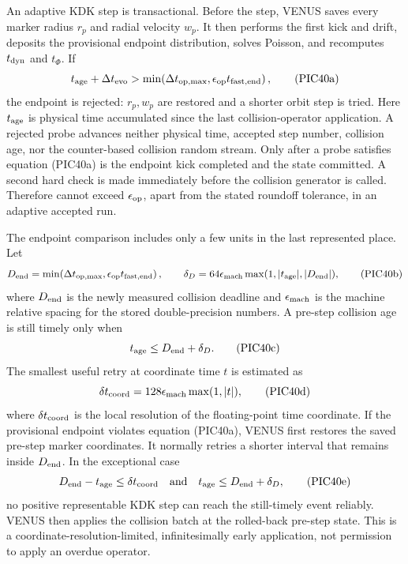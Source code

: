 An adaptive KDK step is transactional.  Before the step, VENUS saves every
marker radius \(r_p\) and radial velocity \(w_p\).  It then performs the first
kick and drift, deposits the provisional endpoint distribution, solves
Poisson, and recomputes \(t_{\rm dyn}\) and \(t_\Phi\).  If
\[
 t_{\rm age}+\Delta t_{\rm evo}>
 \min\!\left(\Delta t_{\rm op,max},
             \epsilon_{\rm op}t_{\rm fast,end}\right), \tag{PIC40a}
\]
the endpoint is rejected: \(r_p,w_p\) are restored and a shorter orbit step
is tried.  Here \(t_{\rm age}\) is physical time accumulated since the last
collision-operator application.  A rejected probe advances neither physical
time, accepted step number, collision age, nor the counter-based collision
random stream.  Only after a probe satisfies equation (PIC40a) is the endpoint
kick completed and the state committed.  A second hard check is made
immediately before the collision generator is called.  Therefore
 cannot exceed
\(\epsilon_{\rm op}\), apart from the stated roundoff tolerance, in an
adaptive accepted run.

The endpoint comparison includes only a few units in the last represented
place.  Let
\[
 D_{\rm end}=
 \min\!\left(\Delta t_{\rm op,max},
             \epsilon_{\rm op}t_{\rm fast,end}\right),
 \qquad
 \delta_D=64\epsilon_{\rm mach}
 \max(1,|t_{\rm age}|,|D_{\rm end}|),                    \tag{PIC40b}
\]
where \(D_{\rm end}\) is the newly measured collision deadline and
\(\epsilon_{\rm mach}\) is the machine relative spacing for the stored
double-precision numbers.  A pre-step collision age is still timely only
when
\[
 t_{\rm age}\leq D_{\rm end}+\delta_D.                   \tag{PIC40c}
\]
The smallest useful retry at coordinate time \(t\) is estimated as
\[
 \delta t_{\rm coord}=128\epsilon_{\rm mach}
                       \max(1,|t|),                      \tag{PIC40d}
\]
where \(\delta t_{\rm coord}\) is the local resolution of the floating-point
time coordinate.  If the provisional endpoint violates equation (PIC40a),
VENUS first restores the saved pre-step marker coordinates.  It normally
retries a shorter interval that remains inside \(D_{\rm end}\).  In the
exceptional case
\[
 D_{\rm end}-t_{\rm age}\leq\delta t_{\rm coord}
 \quad\hbox{and}\quad
 t_{\rm age}\leq D_{\rm end}+\delta_D,                   \tag{PIC40e}
\]
no positive representable KDK step can reach the still-timely event
reliably.  VENUS then applies the collision batch at the rolled-back pre-step
state.  This is a coordinate-resolution-limited, infinitesimally early
application, not permission to apply an overdue operator.

